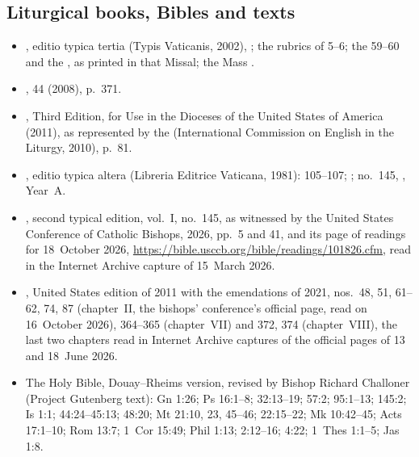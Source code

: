 {\small
\subsection*{Liturgical books, Bibles and texts}
\begin{itemize}[itemsep=0pt,topsep=.25em]
\item {}, editio typica tertia (Typis Vaticanis, 2002), ; the rubrics of  5--6; the  59--60 and the , as printed in that Missal; the Mass .
\item {},  44 (2008), p.~371.
\item {}, Third Edition, for Use in the Dioceses of the United States of America (2011), as represented by the  (International Commission on English in the Liturgy, 2010), p.~81.
\item {}, editio typica altera (Libreria Editrice Vaticana, 1981):  105--107; ; no.~145, , Year~A.
\item {}, second typical edition, vol.~I, no.~145, as witnessed by the United States Conference of Catholic Bishops,  2026, pp.~5 and 41, and its page of readings for 18~October 2026, \url{https://bible.usccb.org/bible/readings/101826.cfm}, read in the Internet Archive capture of 15~March 2026.
\item {}, United States edition of 2011 with the emendations of 2021, nos.~48, 51, 61--62, 74, 87 (chapter~II, the bishops' conference's official page, read on 16~October 2026), 364--365 (chapter~VII) and 372, 374 (chapter~VIII), the last two chapters read in Internet Archive captures of the official pages of 13 and 18~June 2026.
\item The Holy Bible, Douay--Rheims version, revised by Bishop Richard Challoner (Project Gutenberg text): Gn 1:26; Ps 16:1--8; 32:13--19; 57:2; 95:1--13; 145:2; Is 1:1; 44:24--45:13; 48:20; Mt 21:10, 23, 45--46; 22:15--22; Mk 10:42--45; Acts 17:1--10; Rom 13:7; 1~Cor 15:49; Phil 1:13; 2:12--16; 4:22; 1~Thes 1:1--5; Jas 1:8.

\end{itemize}}
